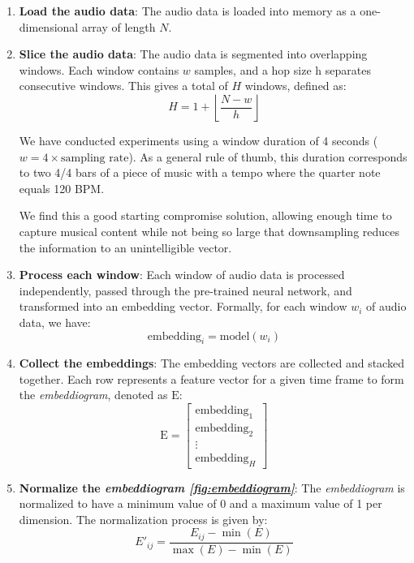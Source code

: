 \begin{enumerate}
\item \textbf{Load the audio data}: The audio data is loaded into memory as a one-dimensional array of length $N$.

\item \textbf{Slice the audio data}: The audio data is segmented into overlapping windows. Each window contains $w$ samples, and a hop size h separates consecutive windows. This gives a total of $H$ windows, defined as:
\begin{equation}
H = 1 + \left\lfloor \frac{N - w}{h} \right\rfloor
\end{equation}

We have conducted experiments using a window duration of 4 seconds (\(w = 4 \times \text{{sampling rate}}\)). As a general rule of thumb, this duration corresponds to two 4/4 bars of a piece of music with a tempo where the quarter note equals 120 BPM.

We find this a good starting compromise solution, allowing enough time to capture musical content while not being so large that downsampling reduces the information to an unintelligible vector.

\item \textbf{Process each window}: Each window of audio data is processed independently, passed through the pre-trained neural network, and transformed into an embedding vector. Formally, for each window $w_i$ of audio data, we have:
\begin{equation}
\text{embedding}_i = \text{model}(w_i)
\end{equation}

\item \textbf{Collect the embeddings}: The embedding vectors are collected and stacked together. Each row represents a feature vector for a given time frame to form the \textit{embeddiogram}, denoted as $\text{E}$:
\begin{equation}
\text{E} = \begin{bmatrix} \text{embedding}_1 \\ \text{embedding}_2 \\ \vdots \\ \text{embedding}_H \end{bmatrix}
\end{equation}

\item \textbf{Normalize the \textit{embeddiogram \ref{fig:embeddiogram}}}: The \textit{embeddiogram} is normalized to have a minimum value of 0 and a maximum value of 1 per dimension. The normalization process is given by:
\begin{equation}
E'_{ij} = \frac{E_{ij} - \min(E)}{\max(E) - \min(E)}
\end{equation}
\end{enumerate}

